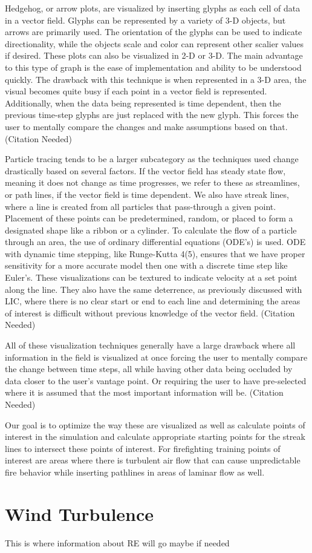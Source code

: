 Hedgehog, or arrow plots, are visualized by inserting glyphs as each cell of data in a vector field. Glyphs can be represented by a variety of 3-D objects, but arrows are primarily used. The orientation of the glyphs can be used to indicate directionality, while the objects scale and color can represent other scalier values if desired. These plots can also be visualized in 2-D or 3-D. The main advantage to this type of graph is the ease of implementation and  ability to be understood quickly. The drawback with this technique is when represented in a 3-D area, the visual becomes quite busy if each point in a vector field is represented. Additionally, when the data being represented is time dependent, then the previous time-step glyphs are just replaced with the new glyph. This forces the user to mentally compare the changes and make assumptions based on that. (Citation Needed) 
\par
Particle tracing tends to be a larger subcategory as the techniques used change drastically based on several factors. If the vector field has steady state flow, meaning it does not change as time progresses, we refer to these as streamlines, or path lines, if the vector field is time dependent. We also have streak lines, where a line is created from all particles that pass-through a given point. Placement of these points can be predetermined, random, or placed to form a designated shape like a ribbon or a cylinder. To calculate the flow of a particle through an area, the use of ordinary differential equations (ODE’s) is used. ODE with dynamic time stepping, like Runge-Kutta 4(5), ensures that we have proper sensitivity for a more accurate model then one with a discrete time step like Euler’s. These visualizations can be textured to indicate velocity at a set point along the line. They also have the same deterrence, as previously discussed with LIC, where there is no clear start or end to each line and determining the areas of interest is difficult without previous knowledge of the vector field. (Citation Needed) 
\par
All of these visualization techniques  generally have a large drawback where all information in the field is visualized at once forcing the user to  mentally compare the change  between time steps, all while having other data being occluded by data closer to the user’s vantage point. Or requiring the user to have pre-selected where it is assumed that the most important information will be. (Citation Needed) 


Our goal is to optimize the way these are visualized as well as calculate points of interest in the simulation and calculate appropriate starting points for the streak lines to intersect these points of interest. For firefighting training points of interest are areas where there is turbulent air flow that can cause unpredictable fire behavior while inserting pathlines in areas of laminar flow as well.


\section{Wind Turbulence}

This is where information about RE will go maybe if needed





